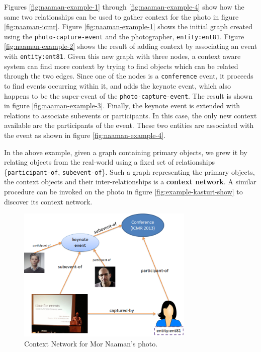 Figures \ref{fig:naaman-example-1} through \ref{fig:naaman-example-4} show how the same two relationships can be used to gather context for the photo in figure \ref{fig:naaman-icmr}. Figure \ref{fig:naaman-example-1} shows the initial graph created using the \texttt{photo-capture-event} and the photographer, \texttt{entity:ent81}. Figure \ref{fig:naaman-example-2} shows the result of adding context by associating an event with \texttt{entity:ent81}. Given this new graph with three nodes, a context aware system can find more context by trying to find objects which can be related through the two edges. Since one of the nodes is a \texttt{conference} event, it proceeds to find events occurring within it, and adds the keynote event, which also happens to be the super-event of the \texttt{photo-capture-event}. The result is shown in figure \ref{fig:naaman-example-3}. Finally, the keynote event is extended with relations to associate subevents or participants. In this case, the only new context available are the participants of the event. These two entities are associated with the event as shown in figure \ref{fig:naaman-example-4}.

In the above example, given a graph containing primary objects, we grew it by relating objects from the real-world using a fixed set of relationships \{\texttt{participant-of}, \texttt{subevent-of}\}. Such a graph representing the primary objects, the context objects and their inter-relationships is a \textbf{context network}. A similar procedure can be invoked on the photo in figure \ref{fig:example-kasturi-show} to discover its context network.

\begin{figure}[h]
\centering
\includegraphics[width=0.75\textwidth]{media/chapter2/naaman-4.png}
\caption{Context Network for Mor Naaman's photo.}
\label{fig:cn-def}
\end{figure}

